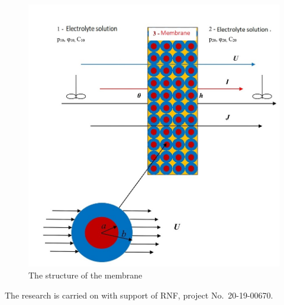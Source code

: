 \documentclass[12pt]{llncs}
\begin{document}
\begin{center}
\begin{figure}[ht]
\centering
\includegraphics[width=0.5\linewidth]{Koroleva_cell2.png}
\caption{The structure of the membrane}
 \end{figure}
\end{center}



The research is carried on with support of RNF,  project No.~20-19-00670.
\end{document}
